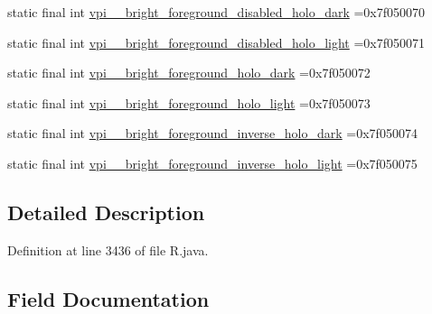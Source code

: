 \begin{DoxyCompactItemize}
\item 
static final int \mbox{\hyperlink{classcom_1_1example_1_1trainawearapplication_1_1_r_1_1color_aef59e38cd7bfb0c326f154d0888c679c}{vpi\+\_\+\+\_\+bright\+\_\+foreground\+\_\+disabled\+\_\+holo\+\_\+dark}} =0x7f050070
\item 
static final int \mbox{\hyperlink{classcom_1_1example_1_1trainawearapplication_1_1_r_1_1color_a5f9fb3d5150539994c0af6883a3bae8b}{vpi\+\_\+\+\_\+bright\+\_\+foreground\+\_\+disabled\+\_\+holo\+\_\+light}} =0x7f050071
\item 
static final int \mbox{\hyperlink{classcom_1_1example_1_1trainawearapplication_1_1_r_1_1color_a3abb7836731438e34071ca0f4c39bc46}{vpi\+\_\+\+\_\+bright\+\_\+foreground\+\_\+holo\+\_\+dark}} =0x7f050072
\item 
static final int \mbox{\hyperlink{classcom_1_1example_1_1trainawearapplication_1_1_r_1_1color_a490109f0bbdb53fe70bcdd743d223610}{vpi\+\_\+\+\_\+bright\+\_\+foreground\+\_\+holo\+\_\+light}} =0x7f050073
\item 
static final int \mbox{\hyperlink{classcom_1_1example_1_1trainawearapplication_1_1_r_1_1color_a015b013e6921eea4e9592465e08c859c}{vpi\+\_\+\+\_\+bright\+\_\+foreground\+\_\+inverse\+\_\+holo\+\_\+dark}} =0x7f050074
\item 
static final int \mbox{\hyperlink{classcom_1_1example_1_1trainawearapplication_1_1_r_1_1color_a92e0ff49cbb2ed8d7d3df49f9e95cd6a}{vpi\+\_\+\+\_\+bright\+\_\+foreground\+\_\+inverse\+\_\+holo\+\_\+light}} =0x7f050075
\end{DoxyCompactItemize}


\subsection{Detailed Description}


Definition at line 3436 of file R.\+java.



\subsection{Field Documentation}
\mbox{\label{classcom_1_1example_1_1trainawearapplication_1_1_r_1_1color_a6581ed6caec163c0b54cc5f2a66d9a1f}} 
